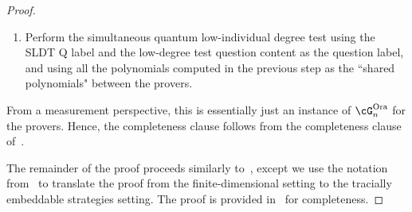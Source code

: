 \begin{proof}
\begin{enumerate}
\begin{enumerate}
		\item Perform the simultaneous quantum low-individual degree test using the SLDT Q label and the low-degree test question content as the question label, and using all the polynomials computed in the previous step as the ``shared polynomials" between the provers. 
	\end{enumerate}
\end{enumerate}
From a measurement perspective, this is essentially just an instance of $\cG_n^{\text{Ora}}$ for the provers. Hence, the completeness clause follows from the completeness clause of~. 

The remainder of the proof proceeds similarly to~\cite[Section 10.7]{jiMIPRE2022a}, except we use the notation from~ to translate the proof from the finite-dimensional setting to the tracially embeddable strategies setting. The proof is provided in~ for completeness. 

\end{proof}

